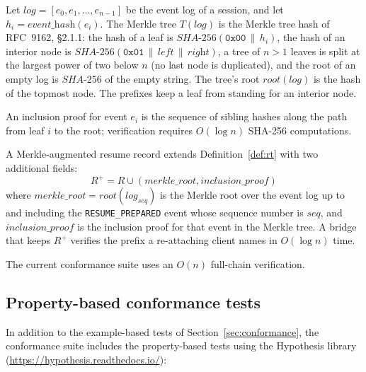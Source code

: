 \begin{definition}\label{def:merkle}
Let $\mathit{log} = [e_0, e_1, \ldots, e_{n-1}]$ be the event log of a
session, and let $h_i = \textit{event\_hash}(e_i)$. The Merkle tree
$T(\mathit{log})$ is the Merkle tree hash of RFC~9162, \S2.1.1: the hash of
a leaf is $\textit{SHA-256}(\texttt{0x00} \,\|\, h_i)$, the hash of an
interior node is $\textit{SHA-256}(\texttt{0x01} \,\|\, \textit{left} \,\|\,
\textit{right})$, a tree of $n>1$ leaves is split at the largest power of two
below $n$ (no last node is duplicated), and the root of an empty log is
$\textit{SHA-256}$ of the empty string. The tree's root
$\textit{root}(\mathit{log})$ is the hash of the topmost node. The prefixes
keep a leaf from standing for an interior node.

An inclusion proof for event $e_i$ is the sequence of sibling hashes
along the path from leaf $i$ to the root; verification requires
$O(\log n)$ SHA-256 computations.
\end{definition}

\begin{definition}\label{def:merkle-rt}
A Merkle-augmented resume record extends
Definition~\ref{def:rt} with two additional fields:
\[
R^+ = R \cup (\textit{merkle\_root}, \textit{inclusion\_proof})
\]
where $\textit{merkle\_root} = \textit{root}(\mathit{log}_{\textit{seq}})$
is the Merkle root over the event log up to and including the
\texttt{RESUME\_PREPARED} event whose sequence number is
$\mathit{seq}$, and $\textit{inclusion\_proof}$ is the inclusion proof
for that event in the Merkle tree. A bridge that keeps $R^+$ verifies
the prefix a re-attaching client names in $O(\log n)$ time.

\end{definition}

The current conformance suite uses an $O(n)$
full-chain verification.

\subsection{Property-based conformance tests}
\label{app:property-tests}

In addition to the example-based tests of
Section~\ref{sec:conformance}, the conformance suite includes the
property-based tests using the Hypothesis library
(\url{https://hypothesis.readthedocs.io/}):

